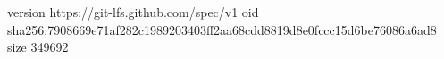version https://git-lfs.github.com/spec/v1
oid sha256:7908669e71af282c1989203403ff2aa68cdd8819d8e0fccc15d6be76086a6ad8
size 349692
